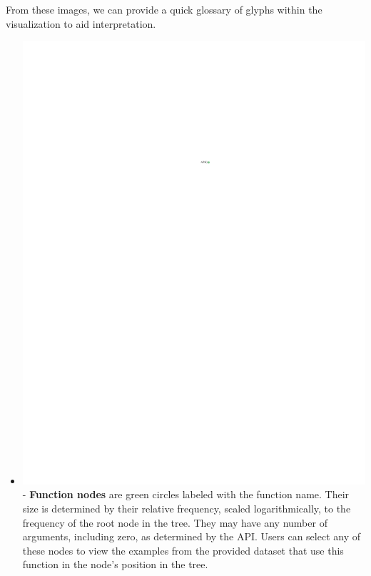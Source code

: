\documentclass[conference]{IEEEtran}
\begin{document}
	From these images, we can provide a quick glossary of glyphs within the
	visualization to aid interpretation. \begin{itemize} \item
		\includegraphics{glossary-green} - \textbf{Function nodes} are green circles
		labeled with the function name. Their size is determined by their relative
		frequency, scaled logarithmically, to the frequency of the root node in the
		tree. They may have any number of arguments, including zero, as determined by
		the API. Users can select any of these nodes to view the examples from the
		provided dataset that use this function in the node's position in the tree.
		

\end{itemize}
\end{document}
